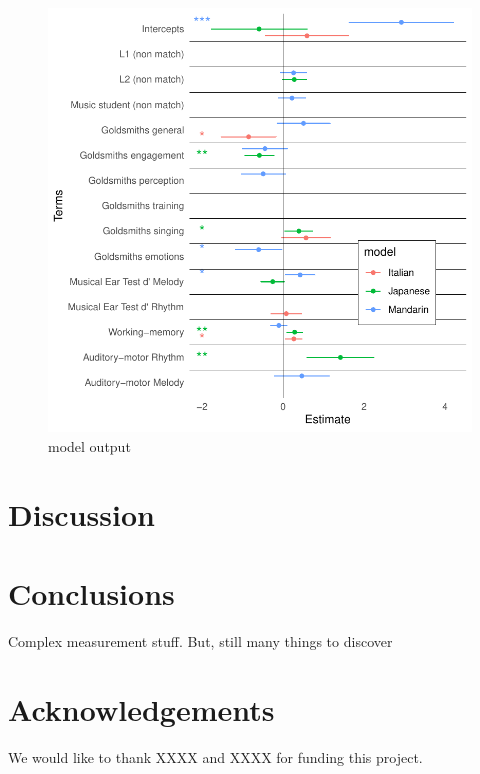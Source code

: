 \documentclass[a4paper]{article}
\begin{document}
\begin{figure}[t]
  \centering
  \includegraphics[width=\linewidth]{SP_24_visuals/Japanese,Italian,_Mandarin_max_models_structure:_parsimonious_effects.pdf}
  \caption{model output}
  \label{fig:model}
\end{figure}

\section{Discussion}

\section{Conclusions}

Complex measurement stuff. But, still many things to discover

\section{Acknowledgements}

We would like to thank XXXX and XXXX for funding this project. \\




\end{document}
